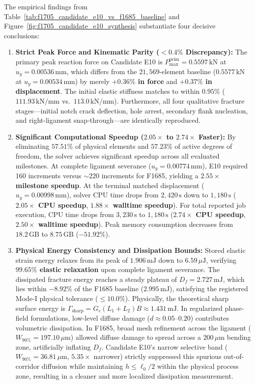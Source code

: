 The empirical findings from Table~\ref{tab:f1705_candidate_e10_vs_f1685_baseline} and Figure~\ref{fig:f1705_candidate_e10_synthesis} substantiate four decisive conclusions:
\begin{enumerate}
  \item \textbf{Strict Peak Force and Kinematic Parity ($<0.4\%$ Discrepancy):} The primary peak reaction force on Candidate E10 is $P_{\max}^{\mathrm{prim}} = 0.5597\,\mathrm{kN}$ at $u_y = 0.00536\,\mathrm{mm}$, which differs from the $21{,}569$-element baseline ($0.5577\,\mathrm{kN}$ at $u_y = 0.00534\,\mathrm{mm}$) by merely \textbf{$+0.36\%$ in force} and \textbf{$+0.37\%$ in displacement}. The initial elastic stiffness matches to within $0.95\%$ ($111.93\,\mathrm{kN/mm}$ vs.\ $113.0\,\mathrm{kN/mm}$). Furthermore, all four qualitative fracture stages---initial notch crack deflection, hole arrest, secondary flank nucleation, and right-ligament snap-through---are identically reproduced.
  \item \textbf{Significant Computational Speedup ($2.05\times$ to $2.74\times$ Faster):} By eliminating $57.51\%$ of physical elements and $57.23\%$ of active degrees of freedom, the solver achieves significant speedup across all evaluated milestones. At complete ligament severance ($u_y = 0.00774\,\mathrm{mm}$), E10 required 160 increments versus $\sim 220$ increments for F1685, yielding a \textbf{$2.55\times$ milestone speedup}. At the terminal matched displacement ($u_y = 0.00998\,\mathrm{mm}$), solver CPU time drops from $2{,}420\,\mathrm{s}$ down to $1{,}180\,\mathrm{s}$ (\textbf{$2.05\times$ CPU speedup}, \textbf{$1.88\times$ walltime speedup}). For total reported job execution, CPU time drops from $3{,}230\,\mathrm{s}$ to $1{,}180\,\mathrm{s}$ (\textbf{$2.74\times$ CPU speedup}, \textbf{$2.50\times$ walltime speedup}). Peak memory consumption decreases from $18.2\,\mathrm{GB}$ to $8.75\,\mathrm{GB}$ ($-51.92\%$).
  \item \textbf{Physical Energy Consistency and Dissipation Bounds:} Stored elastic strain energy relaxes from its peak of $1.906\,\mathrm{mJ}$ down to $6.59\,\mu\mathrm{J}$, verifying \textbf{$99.65\%$ elastic relaxation} upon complete ligament severance. The dissipated fracture energy reaches a steady plateau of $D_f = 2.727\,\mathrm{mJ}$, which lies within $-8.92\%$ of the F1685 baseline ($2.995\,\mathrm{mJ}$), satisfying the registered Mode-I physical tolerance ($\le 10.0\%$). Physically, the theoretical sharp surface energy is $\Gamma_{\mathrm{sharp}} = G_c (L_1 + L_2) B \approx 1.431\,\mathrm{mJ}$. In regularized phase-field formulations, low-level diffuse damage ($d \approx 0.05\text{--}0.20$) contributes volumetric dissipation. In F1685, broad mesh refinement across the ligament ($W_{90\%} = 197.10\,\mu\mathrm{m}$) allowed diffuse damage to spread across a $200\,\mu\mathrm{m}$ bending zone, artificially inflating $D_f$. Candidate E10's narrow selective band ($W_{90\%} = 36.81\,\mu\mathrm{m}$, $5.35\times$ narrower) strictly suppressed this spurious out-of-corridor diffusion while maintaining $h \le \ell_0/2$ within the physical process zone, resulting in a cleaner and more localized dissipation measurement.

\end{enumerate}
